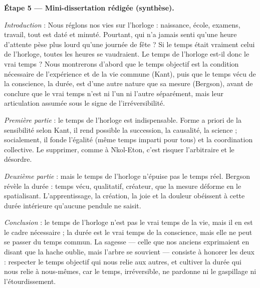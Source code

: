 \documentclass[11pt]{article}
\begin{document}
\begin{exoresolu}
\textbf{Étape 5 — Mini-dissertation rédigée (synthèse).}\par
\emph{Introduction} : Nous réglons nos vies sur l'horloge : naissance, école, examens, travail, tout est daté et minuté. Pourtant, qui n'a jamais senti qu'une heure d'attente pèse plus lourd qu'une journée de fête ? Si le temps était vraiment celui de l'horloge, toutes les heures se vaudraient. Le temps de l'horloge est-il donc le vrai temps ? Nous montrerons d'abord que le temps objectif est la condition nécessaire de l'expérience et de la vie commune (Kant), puis que le temps vécu de la conscience, la durée, est d'une autre nature que sa mesure (Bergson), avant de conclure que le vrai temps n'est ni l'un ni l'autre séparément, mais leur articulation assumée sous le signe de l'irréversibilité.\par
\emph{Première partie} : le temps de l'horloge est indispensable. Forme a priori de la sensibilité selon Kant, il rend possible la succession, la causalité, la science ; socialement, il fonde l'égalité (même temps imparti pour tous) et la coordination collective. Le supprimer, comme à Nkol-Eton, c'est risquer l'arbitraire et le désordre.\par
\emph{Deuxième partie} : mais le temps de l'horloge n'épuise pas le temps réel. Bergson révèle la durée : temps vécu, qualitatif, créateur, que la mesure déforme en le spatialisant. L'apprentissage, la création, la joie et la douleur obéissent à cette durée intérieure qu'aucune pendule ne saisit.\par
\emph{Conclusion} : le temps de l'horloge n'est pas le vrai temps de la vie, mais il en est le cadre nécessaire ; la durée est le vrai temps de la conscience, mais elle ne peut se passer du temps commun. La sagesse — celle que nos anciens exprimaient en disant que \guillemotleft la hache oublie, mais l'arbre se souvient \guillemotright — consiste à honorer les deux : respecter le temps objectif qui nous relie aux autres, et cultiver la durée qui nous relie à nous-mêmes, car le temps, irréversible, ne pardonne ni le gaspillage ni l'étourdissement.
\end{exoresolu}
\end{document}
